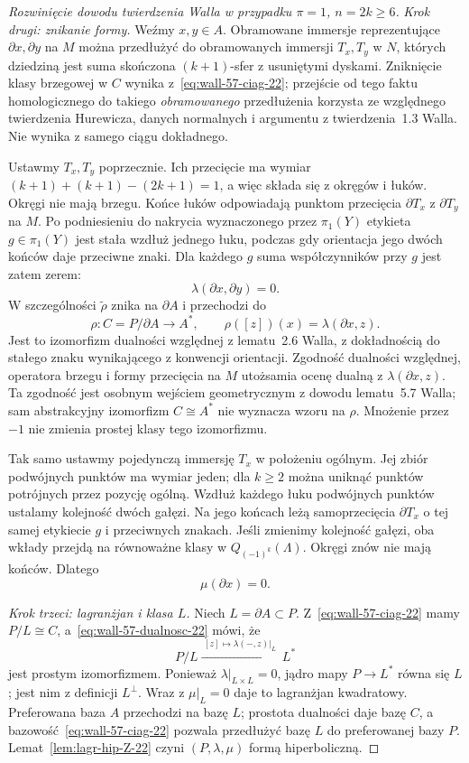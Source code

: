 \begin{proof}[Rozwinięcie dowodu twierdzenia Walla w przypadku
 $\pi=1$, $n=2k\geq6$]
\emph{Krok drugi: znikanie formy.}
Weźmy $x,y\in A$. Obramowane immersje
reprezentujące $\partial x,\partial y$
na $M$ można przedłużyć do obramowanych
immersji $T_x,T_y$ w $N$, których dziedziną
jest suma skończona $(k+1)$-sfer z usuniętymi
dyskami. Zniknięcie klasy brzegowej w $C$
wynika z~\eqref{eq:wall-57-ciag-22};
przejście od tego faktu homologicznego do
takiego \emph{obramowanego} przedłużenia
korzysta ze względnego twierdzenia Hurewicza,
danych normalnych i argumentu z twierdzenia~1.3
Walla. Nie wynika z samego ciągu dokładnego.

Ustawmy $T_x,T_y$ poprzecznie. Ich przecięcie
ma wymiar $(k+1)+(k+1)-(2k+1)=1$,
a więc składa się z okręgów i łuków.
Okręgi nie mają brzegu. Końce łuków
odpowiadają punktom przecięcia
$\partial T_x$ z $\partial T_y$ na $M$.
Po podniesieniu do nakrycia wyznaczonego
przez $\pi_1(Y)$ etykieta $g\in\pi_1(Y)$
jest stała wzdłuż jednego łuku, podczas
gdy orientacja jego dwóch końców daje
przeciwne znaki. Dla każdego $g$ suma
współczynników przy $g$ jest zatem zerem:
\[
 \lambda(\partial x,\partial y)=0.
\]
W szczególności $\widetilde\rho$ znika
na $\partial A$ i przechodzi do
\begin{equation}\label{eq:wall-57-dualnosc-22}
 \rho:C=P/\partial A\longrightarrow A^*,
 \qquad \rho([z])(x)=\lambda(\partial x,z).
\end{equation}
Jest to izomorfizm dualności względnej
z lematu~2.6 Walla, z dokładnością do
stałego znaku wynikającego z konwencji
orientacji. Zgodność dualności względnej,
operatora brzegu i formy przecięcia na $M$
utożsamia ocenę dualną z $\lambda(\partial x,z)$.
Ta zgodność jest osobnym wejściem
geometrycznym z dowodu lematu~5.7 Walla;
sam abstrakcyjny izomorfizm $C\cong A^*$
nie wyznacza wzoru na $\rho$.
Mnożenie przez $-1$ nie zmienia prostej
klasy tego izomorfizmu.

Tak samo ustawmy pojedynczą immersję
$T_x$ w położeniu ogólnym. Jej zbiór
podwójnych punktów ma wymiar jeden;
dla $k\geq2$ można uniknąć punktów
potrójnych przez pozycję ogólną.
Wzdłuż każdego łuku podwójnych punktów
ustalamy kolejność dwóch gałęzi.
Na jego końcach leżą samoprzecięcia
$\partial T_x$ o tej samej etykiecie
$g$ i przeciwnych znakach. Jeśli
zmienimy kolejność gałęzi, oba wkłady
przejdą na równoważne klasy w
$Q_{(-1)^k}(\Lambda)$.
Okręgi znów nie mają końców. Dlatego
\[
 \mu(\partial x)=0.
\]

\emph{Krok trzeci: lagranżjan i klasa $L$.}
Niech $L=\partial A\subset P$.
Z~\eqref{eq:wall-57-ciag-22} mamy $P/L\cong C$,
a~\eqref{eq:wall-57-dualnosc-22} mówi, że
\[
 P/L\xrightarrow{\;[z]\mapsto
           \lambda(-,z)|_L\;}L^*
\]
jest prostym izomorfizmem. Ponieważ
$\lambda|_{L\times L}=0$, jądro mapy
$P\to L^*$ równa się $L$; jest nim
z definicji $L^\perp$. Wraz z
$\mu|_L=0$ daje to lagranżjan kwadratowy.
Preferowana baza $A$ przechodzi na bazę
$L$; prostota dualności daje bazę $C$,
a bazowość~\eqref{eq:wall-57-ciag-22}
pozwala przedłużyć bazę $L$ do
preferowanej bazy $P$.
Lemat~\ref{lem:lagr-hip-Z-22} czyni
$(P,\lambda,\mu)$ formą hiperboliczną.


\end{proof}
